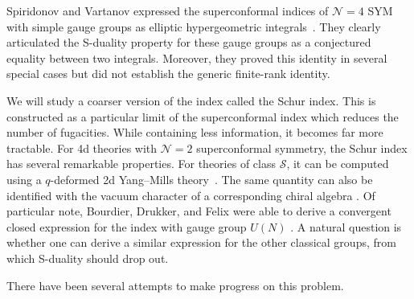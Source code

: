 Spiridonov and Vartanov expressed the superconformal indices of $\mathcal N=4$
SYM with simple gauge groups as elliptic hypergeometric
integrals~\cite{SpiridonovVartanov2012,Spiridonov:2020intro}. They clearly
articulated the S-duality property for these gauge groups as a conjectured
equality between two integrals. Moreover, they proved this identity in several
special cases but did not establish the generic finite-rank identity.

We will study a coarser version of the index called the Schur index. This is
constructed as a particular limit of the superconformal index which reduces the
number of fugacities. While containing less information, it becomes far more
tractable. For 4d theories with $\mathcal N=2$ superconformal symmetry, the
Schur index has several remarkable properties. For theories of class $\mathcal
S$, it can be computed using a $q$-deformed 2d Yang--Mills
theory~\cite{Gadde:2011ik}. The same quantity can also be identified with the
vacuum character of a corresponding chiral algebra
\cite{Beem:2013sza,Beem:2017ooy}. Of particular note, Bourdier, Drukker, and
Felix were able to derive a convergent closed expression for the index with
gauge group $U(N)$ \cite{Bourdier:2015wda}. A natural question is whether one
can derive a similar expression for the other classical groups, from which
S-duality should drop out.

There have been several attempts to make progress on this problem.


